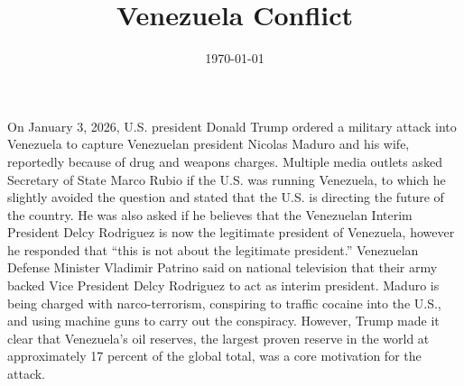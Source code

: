 \documentclass[12pt, letterpaper]{article}
\title{Venezuela Conflict}
\date{\today}
\begin{document}
\maketitle

On January 3, 2026, U.S. president Donald Trump ordered a military attack into Venezuela to capture Venezuelan president Nicolas Maduro and his wife, reportedly because of drug and weapons charges. Multiple media outlets asked Secretary of State Marco Rubio if the U.S. was running Venezuela, to which he slightly avoided the question and stated that the U.S. is directing the future of the country. He was also asked if he believes that the Venezuelan Interim President Delcy Rodriguez is now the legitimate president of Venezuela, however he responded that ``this is not about the legitimate president.'' Venezuelan Defense Minister Vladimir Patrino said on national television that their army backed Vice President Delcy Rodriguez to act as interim president. Maduro is being charged with narco-terrorism, conspiring to traffic cocaine into the U.S., and using machine guns to carry out the conspiracy. However, Trump made it clear that Venezuela's oil reserves, the largest proven reserve in the world at approximately 17 percent of the global total, was a core motivation for the attack.
\end{document}
